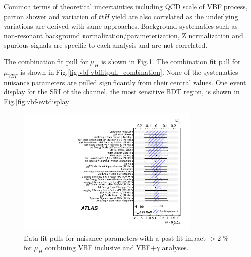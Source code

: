 Common terms of theoretical uncertainties including QCD scale of VBF process, parton shower and variation of $ttH$ yield are also correlated as the underlying variations are derived with same approaches. Background systematics such as non-resonant background normalization/parameterization, Z normalization and spurious signals are specific to each analysis and are not correlated.

The combination fit pull for $\mu_H$ is shown in Fig.\ref{fig:vbf-higgsfitpull_combination}. The combination fit pull for $\mu_{VBF}$ is shown in Fig.\ref{fig:vbf-vbffitpull_combination}. None of the systematics nuisance parameters are pulled significantly from their central values. One event display for the SRI of the \twocentral channel, the most sensitive BDT region, is shown in Fig.\ref{fig:vbf-evtdisplay}.




\begin{figure}[htbp]
  \centering
 \includegraphics[width=0.8\textwidth]{figures/VBF/VBFHbb_Combined_pulls_125.pdf}
\caption{Data fit pulls for nuisance parameters with a post-fit impact $> 2$ \% for $\mu_H$ combining VBF inclusive and VBF$+\gamma$ analyses.}
  \label{fig:vbf-higgsfitpull_combination}
\end{figure}

